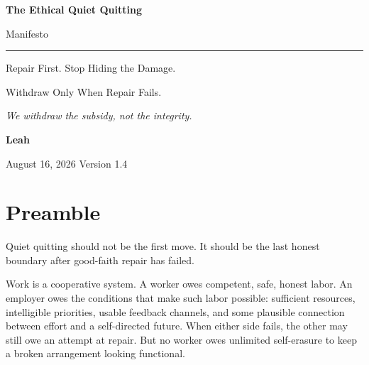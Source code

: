 \documentclass[11pt,oneside]{article}
\begin{document}
\hypersetup{pageanchor=false}

\begin{titlepage}
\thispagestyle{empty}
\vspace*{0.9in}

{\sffamily\bfseries\fontsize{31}{36}\selectfont\color{ManifestInk}
The Ethical Quiet Quitting\par
Manifesto\par}

\vspace{0.5em}
{\color{ManifestRule}\rule{\textwidth}{1.2pt}}
\vspace{1.0em}

{\sffamily\fontsize{17}{23}\selectfont\color{ManifestGray}
Repair First. Stop Hiding the Damage.\par
Withdraw Only When Repair Fails.\par}

\vfill

\begin{tcolorbox}[
  enhanced,
  colback=ManifestLight,
  colframe=ManifestRule,
  boxrule=0pt,
  leftrule=4pt,
  arc=0pt,
  left=14pt,right=14pt,top=13pt,bottom=13pt
]
{\Large\itshape We withdraw the subsidy, not the integrity.}
\end{tcolorbox}

\vfill

{\sffamily\large\bfseries Leah\par}
\vspace{0.2em}
{\sffamily\color{ManifestGray}August 16, 2026 \quad Version 1.4\par}
\vspace{0.55in}
\end{titlepage}

\thispagestyle{plain}
\tableofcontents
\clearpage
{}
\hypersetup{pageanchor=true}

\section{Preamble}\label{preamble}

Quiet quitting should not be the first move. It should be the last
honest boundary after good-faith repair has failed.

Work is a cooperative system. A worker owes competent, safe, honest
labor. An employer owes the conditions that make such labor possible:
sufficient resources, intelligible priorities, usable feedback channels,
and some plausible connection between effort and a self-directed future.
When either side fails, the other may still owe an attempt at repair.
But no worker owes unlimited self-erasure to keep a broken arrangement
looking functional.
\end{document}
